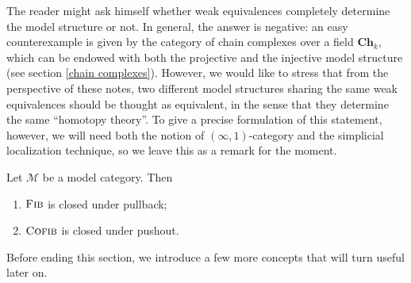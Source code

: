 \begin{refsection}
\begin{rmk}
The reader might ask himself whether weak equivalences completely determine the model structure or not. In general, the answer is negative: an easy counterexample is given by the category of chain complexes over a field $\mathbf{Ch}_k$, which can be endowed with both the projective and the injective model structure (see section \ref{chain complexes}). However, we would like to stress that from the perspective of these notes, two different model structures sharing the same weak equivalences should be thought as equivalent, in the sense that they determine the same ``homotopy theory''. To give a precise formulation of this statement, however, we will need both the notion of $(\infty,1)$-category and the simplicial localization technique, so we leave this as a remark for the moment.
\end{rmk}

\begin{cor} \label{cor stability for base and cobase change}
Let $\mathcal M$ be a model category. Then
\begin{enumerate}
\item $\textsc{Fib}$ is closed under pullback;
\item $\textsc{Cofib}$ is closed under pushout.
\end{enumerate}
\end{cor}

Before ending this section, we introduce a few more concepts that will turn useful later on.


\end{refsection}

